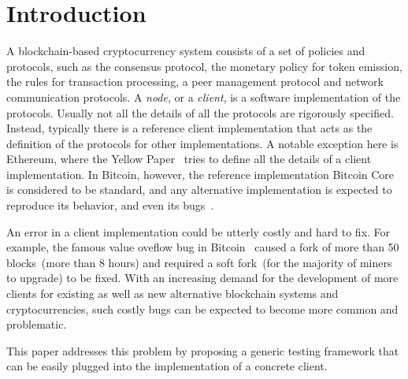 
\section{Introduction}

A blockchain-based cryptocurrency system consists of a set of policies and protocols, such as the consensus protocol, the monetary policy for token emission, the rules for transaction processing, a peer management protocol and network communication protocols. A \emph{node}, or a {\em client}, is a software implementation of the protocols. Usually not all the details of all the protocols are rigorously specified. Instead, typically there is a reference client implementation that acts as the  definition of the protocols for other implementations. A notable exception here is Ethereum, where the Yellow Paper~\cite{ethyp} tries to define all the details of a client implementation. In Bitcoin, however, the reference implementation Bitcoin Core is considered to be standard, and any alternative implementation is expected to reproduce its behavior, and even its bugs~\cite{bitbugs}.

An error in a client implementation could be utterly costly and hard to fix. For example, the famous value oveflow bug in Bitcoin~\cite{overflow} caused a fork of more than 50 blocks~(more than 8 hours) and required a soft fork~(for the majority of miners to upgrade) to be fixed. With an increasing demand for the development of more clients for existing as well as new alternative blockchain systems and cryptocurrencies, such costly bugs can be expected to become more common and problematic. 

This paper addresses this problem by proposing a generic testing framework that can be easily plugged into the implementation of a concrete client.
